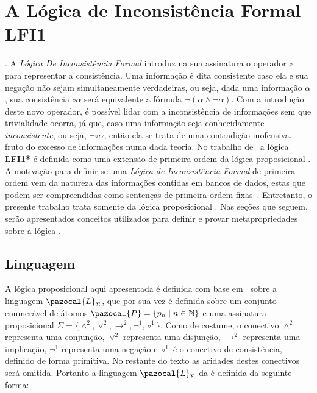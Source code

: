\chapter{A Lógica de Inconsistência Formal LFI1}
\label{cap:LFI1}

. A \textit{Lógica De Inconsistência Formal} \lfium{} introduz na sua assinatura o operador $\circ$ para representar a consistência. Uma informação é dita consistente caso ela e sua negação não sejam simultaneamente verdadeiras, ou seja, dada uma informação $\alpha$, sua consistência $\circ \alpha$ será equivalente a fórmula $\neg (\alpha \land \neg \alpha)$. Com a introdução deste novo operador, é possível lidar com a inconsistência de informações sem que trivialidade ocorra, já que, caso uma informação seja conhecidamente \textit{inconsistente}, ou seja, $\neg \circ \alpha$, então ela se trata de uma contradição inofensiva, fruto do excesso de informações numa dada teoria. No trabalho de~ a lógica \textbf{LFI1*} é definida como uma extensão de primeira ordem da lógica proposicional \lfium{}. A motivação para definir-se uma \textit{Lógica de Inconsistência Formal} de primeira ordem vem da natureza das informações contidas em bancos de dados, estas que podem ser compreendidas como sentenças de primeira ordem fixas~\cite{Codd}. Entretanto, o presente trabalho trata somente da lógica proposicional \lfium{}. Nas seções que seguem, serão apresentados conceitos utilizados para definir e provar metapropriedades sobre a lógica \lfium{}.

\section{Linguagem}
A lógica proposicional \lfium{} aqui apresentada é definida com base em~ sobre a linguagem $\pazocal{L}_{\Sigma}$, que por sua vez é definida sobre um conjunto enumerável de átomos $\pazocal{P} = \{p_{n} \;|\; n \in \mathbb{N}\}$ e uma assinatura proposicional $\Sigma = \{\land^{2}, \lor^{2}, \rightarrow^{2}, \neg^{1}, \circ^{1}\}$. Como de costume, o conectivo $\land^{2}$ representa uma conjunção, $\lor^{2}$ representa uma disjunção, $\rightarrow^{2}$ representa uma implicação, $\neg^{1}$ representa uma negação e $\circ^{1}$ é o conectivo de consistência, definido de forma primitiva. No restante do texto as aridades destes conectivos será omitida. Portanto a linguagem $\pazocal{L}_{\Sigma}$ da \lfium{} é definida da seguinte forma:


